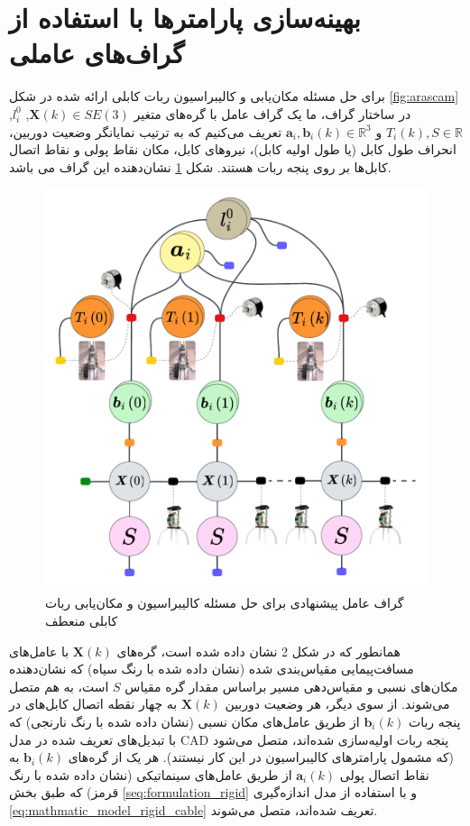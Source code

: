 \section{بهینه‌سازی پارامترها با استفاده از گراف‌های عاملی} \label{seq:factor_graph_for_rigid_cable}

برای حل مسئله مکان‌یابی و کالیبراسیون ربات کابلی ارائه شده در شکل
\ref{fig:arascam}
در ساختار گراف، ما یک گراف عامل با گره‌های متغیر 
$\boldsymbol{X}(k) \in SE(3)$,
$l_{i}^0$,
$T_i(k), S \in \mathbb{R}$ 
و
$\boldsymbol{a}_i, \boldsymbol{b}_i(k) \in \mathbb{R}^3$ 
تعریف می‌کنیم که به ترتیب نمایانگر وضعیت دوربین، انحراف طول کابل (یا طول اولیه کابل)، نیرو‌های کابل، مکان نقاط پولی و نقاط اتصال کابل‌ها بر روی پنجه ربات هستند. شکل 
\ref{fig:rigidcable_factorgraph}
نشان‌دهنده این گراف می باشد. 
\begin{figure}
	\centering
	\includegraphics[width=0.6\linewidth]{img/rigidcable_factorgraph}
	\caption{گراف عامل پیشنهادی برای حل مسئله کالیبراسیون و مکان‌یابی ربات کابلی منعطف}
	\label{fig:rigidcable_factorgraph}
\end{figure}


همانطور که در شکل 2 نشان داده شده است، گره‌های
$\boldsymbol{X}(k)$
با عامل‌های مسافت‌پیمایی مقیاس‌بندی شده (نشان داده شده با رنگ سیاه) که نشان‌دهنده مکان‌های نسبی و مقیاس‌دهی مسیر براساس مقدار گره مقیاس 
$S$
 است، به هم متصل می‌شوند. از سوی دیگر، هر وضعیت دوربین 
$\boldsymbol{X}(k)$
 به چهار نقطه اتصال کابل‌های در پنجه ربات
$\boldsymbol{b}_i(k)$
از طریق عامل‌های مکان نسبی (نشان داده شده با رنگ نارنجی) که با تبدیل‌های تعریف شده در مدل CAD پنجه ربات اولیه‌سازی شده‌اند، متصل می‌شود (که مشمول پارامترهای کالیبراسیون در این کار نیستند). هر یک از گره‌های
$\boldsymbol{b}_i(k)$
به نقاط اتصال پولی
$\boldsymbol{a}_i(k)$
از طریق عامل‌های سینماتیکی (نشان داده شده با رنگ قرمز) که طبق بخش 
\ref{seq:formulation_rigid}
 و با استفاده از مدل اندازه‌گیری
\ref{eq:mathmatic_model_rigid_cable}
تعریف شده‌اند، متصل می‌شوند.

